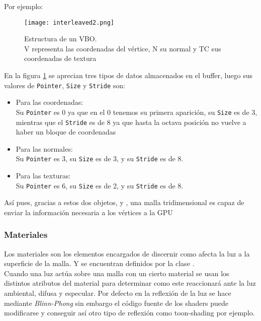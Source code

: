 Por ejemplo:\\
\begin{figure}[h!]
\begin{center}
\texttt{[image: interleaved2.png]}
\end{center}
\caption[Estructura de un VBO]{Estructura de un VBO.\\ V representa las coordenadas del vértice, N su normal y TC sus coordenadas de textura}
\label{interleaved2}
\end{figure}

En la figura \ref{interleaved2} se aprecian tres tipos de datos almacenados en el buffer, luego sus valores de \texttt{Pointer}, \texttt{Size} y \texttt{Stride} son:
\begin{itemize}
\item Para las coordenadas:\\
Su \texttt{Pointer} es 0 ya que en el 0 tenemos su primera aparición, su \texttt{Size} es de 3, mientras que el \texttt{Stride} es de 8 ya que hasta la octava posición no vuelve a haber un bloque de coordenadas

\item Para las normales:\\
Su \texttt{Pointer} es 3, su \texttt{Size} es de 3, y su \texttt{Stride} es de 8.

\item Para las texturas:\\
Su \texttt{Pointer} es 6, su \texttt{Size} es de 2, y su \texttt{Stride} es de 8.
\end{itemize}

Así pues, gracias a estos dos objetos, \rorefbuffer y \rorefbufferkey, una malla tridimensional es capaz de enviar la información necesaria a los vértices a la GPU

\subsubsection{Materiales}
Los materiales son los elementos encargados de discernir como afecta la luz a la superficie de la malla. Y se encuentran definidos por la clase \rorefmaterial.\\

Cuando una luz actúa sobre una malla con un cierto material se usan los distintos atributos del material para determinar como este reaccionará ante la luz ambiental, difusa y especular. Por defecto en \robotto la reflexión de la luz se hace mediante \textit{Blinn-Phong} sin embargo el código fuente de los shaders puede modificarse y conseguir así otro tipo de reflexión como toon-shading por ejemplo.
 

